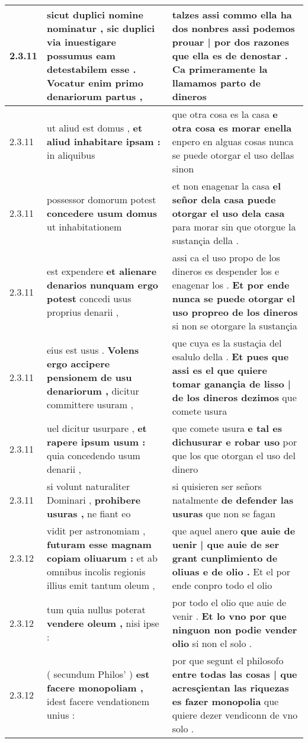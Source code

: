 \begin{tabular}{|p{1cm}|p{6.5cm}|p{6.5cm}|}
2.3.11 & sicut duplici nomine nominatur , \textbf{ sic duplici via inuestigare possumus eam detestabilem esse . } Vocatur enim primo denariorum partus , & talzes assi commo ella ha dos nonbres \textbf{ assi podemos prouar | por dos razones que ella es de denostar . } Ca primeramente la llamamos parto de dineros \\\hline
2.3.11 & ut aliud est domus , \textbf{ et aliud inhabitare ipsam : } in aliquibus & que otra cosa es la casa \textbf{ e otra cosa es morar enella } enpero en alguas cosas nunca se puede otorgar el uso dellas sinon \\\hline
2.3.11 & possessor domorum potest \textbf{ concedere usum domus } ut inhabitationem & et non enagenar la casa \textbf{ el señor dela casa puede otorgar el uso dela casa } para morar sin que otorgue la sustançia della . \\\hline
2.3.11 & est expendere \textbf{ et alienare denarios nunquam ergo potest } concedi usus proprius denarii , & assi ca el uso propo de los dineros es despender los e enagenar los . \textbf{ Et por ende nunca se puede otorgar el uso propreo de los dineros } si non se otorgare la sustançia \\\hline
2.3.11 & eius est usus . \textbf{ Volens ergo accipere pensionem de usu denariorum , } dicitur committere usuram , & que cuya es la sustaçia del esalulo della . \textbf{ Et pues que assi es el que quiere tomar ganançia de lisso | de los dineros dezimos } que comete usura \\\hline
2.3.11 & uel dicitur usurpare , \textbf{ et rapere ipsum usum : } quia concedendo usum denarii , & que comete usura \textbf{ e tal es dichusurar e robar uso } por que los que otorgan el uso del dinero \\\hline
2.3.11 & si volunt naturaliter Dominari , \textbf{ prohibere usuras , } ne fiant eo & si quisieren ser señors natalmente \textbf{ de defender las usuras } que non se fagan \\\hline
2.3.12 & vidit per astronomiam , \textbf{ futuram esse magnam copiam oliuarum : } et ab omnibus incolis regionis illius emit tantum oleum , & que aquel anero \textbf{ que auie de uenir | que auie de ser grant cunplimiento de oliuas e de olio . } Et el por ende conpro todo el olio \\\hline
2.3.12 & tum quia nullus poterat \textbf{ vendere oleum , } nisi ipse : & por todo el olio que auie de venir . \textbf{ Et lo vno por que ninguon non podie vender olio } si non el solo . \\\hline
2.3.12 & ( secundum Philos’ ) \textbf{ est facere monopoliam , } idest facere vendationem unius : & por que segunt el philosofo \textbf{ entre todas las cosas | que acresçientan las riquezas es fazer monopolia } que quiere dezer vendiconn de vno solo . \\\hline

\end{tabular}
